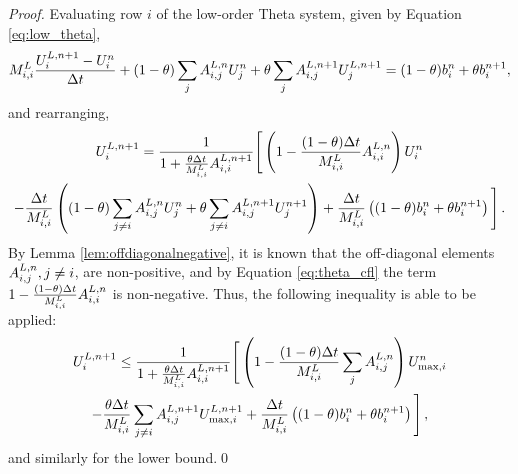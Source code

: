 \begin{proof}
Evaluating row $i$ of the low-order Theta system, given by Equation
\eqref{eq:low_theta},
\[
  M^L_{i,i}\frac{U_i^{L,n+1}-U_i^n}
    {\Delta t}
  + (1-\theta)\sum\limits_jA_{i,j}^{L,n}U_j^n
  + \theta\sum\limits_jA_{i,j}^{L,n+1}U_j^{L,n+1}
  = (1-\theta)b_i^n + \theta b_i^{n+1},
\]
and rearranging,
\begin{multline*}
   U_i^{L,n+1}
   = \frac{1}{1+\frac{\theta\Delta t}{M^L_{i,i}}
       A_{i,i}^{L,n+1}}
     \Bigg[\left(1 - \frac{(1-\theta)\Delta t}{M^L_{i,i}}
     A_{i,i}^{L,n}\right)U_i^n
     \\
     - \frac{\Delta t}{M^L_{i,i}}\left(
       (1-\theta)\sum\limits_{j\ne i}A_{i,j}^{L,n}U_j^n
       + \theta\sum\limits_{j\ne i}A_{i,j}^{L,n+1}U_j^{n+1}\right)
     + \frac{\Delta t}{M^L_{i,i}}
       \left((1-\theta)b_i^n + \theta b_i^{n+1}\right)\Bigg] \,.
\end{multline*}
By Lemma \ref{lem:offdiagonalnegative}, it is known that the off-diagonal
elements $A^{L,n}_{i,j}, j\ne i$, are non-positive, and by Equation
\eqref{eq:theta_cfl} the term $1 -
\frac{(1-\theta)\Delta t}{M^L_{i,i}}A_{i,i}^{L,n}$
is non-negative. Thus, the following inequality is able to be applied:
\begin{multline*}
   U_i^{L,n+1}
   \le \frac{1}{1+\frac{\theta\Delta t}{M^L_{i,i}}
     A_{i,i}^{L,n+1}}
     \Bigg[\left(1 - \frac{(1-\theta)\Delta t}{M^L_{i,i}}
       \sum\limits_jA_{i,j}^{L,n}\right)U_{\max,i}^n
     \\
       - \frac{\theta\Delta t}{M^L_{i,i}}
         \sum\limits_{j\ne i}A_{i,j}^{L,n+1}U_{\max,i}^{L,n+1}
       + \frac{\Delta t}{M^L_{i,i}}
         \left((1-\theta)b_i^n + \theta b_i^{n+1}\right)\Bigg] \,,
\end{multline*}
and similarly for the lower bound.\qed
\end{proof}
